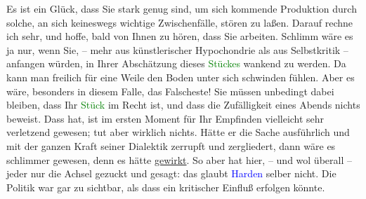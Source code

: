 \pstart
           Es ist ein Glück, dass Sie stark genug sind, um sich kommende Produktion durch
               solche, an sich keineswegs wichtige Zwischenfälle, stören zu laßen. Darauf rechne ich
               sehr, und hoffe, bald von Ihnen zu hören, dass Sie arbeiten. Schlimm wäre es ja nur,
               wenn Sie, – mehr aus künstlerischer Hypochondrie als aus Selbstkritik – anfangen
               würden, in Ihrer Abschätzung dieses \textcolor{green}{Stückes}{}\ledrightnote{{$\rightarrow$}\textcolor{green}{Der Ruf des Lebens. Schauspiel in drei Akten}} wankend zu werden. Da kann man freilich für eine Weile den Boden
               unter sich schwinden fühlen. Aber es wäre, besonders in diesem Falle, das Falscheste!
               Sie müssen unbedingt dabei bleiben, dass Ihr \textcolor{green}{Stück}{}\ledrightnote{{$\rightarrow$}\textcolor{green}{Der Ruf des Lebens. Schauspiel in drei Akten}} im Recht ist, und dass die Zufälligkeit eines Abends nichts
               beweist. Dass \label{K_L03415-4v}\label{K_L03415-4h} hat, ist im ersten
               Moment für Ihr Empfinden vielleicht sehr verletzend gewesen; tut aber wirklich
               nichts. Hätte er die Sache ausführlich und mit der ganzen Kraft seiner Dialektik
               zerrupft und zergliedert, dann wäre es schlimmer gewesen, denn es hätte \uline{gewirkt}. So aber hat hier, – und wol überall – jeder
               nur die Achsel gezuckt und gesagt: das glaubt \textcolor{blue}{Harden}{}\ledrightnote{\textcolor{blue}{Maximilian Harden}} selber nicht. Die Politik war gar zu sichtbar, als dass ein
               kritischer Einfluß erfolgen könnte. \pend
           
